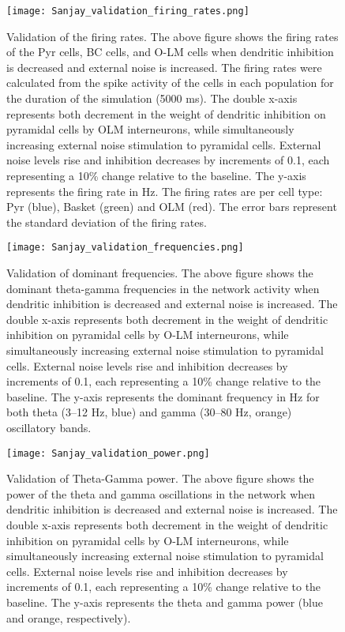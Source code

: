 \begin{figure}[htbp]
    \centering
    \texttt{[image: Sanjay\_validation\_firing\_rates.png]}
    \caption[Validation: Firing rates per population]{Validation of the firing rates.
        The above figure shows the firing rates of the Pyr cells, BC cells, and O-LM cells when dendritic inhibition is decreased and external noise is increased.
        The firing rates were calculated from the spike activity of the cells in each population for the duration of the simulation (5000 ms).
        The double x-axis represents both decrement in the weight of dendritic inhibition on pyramidal cells by OLM interneurons,
        while simultaneously increasing external noise stimulation to pyramidal cells.
        External noise levels rise and inhibition decreases by increments of 0.1, each representing a 10\% change relative to the baseline.
        The y-axis represents the firing rate in Hz.
        The firing rates are per cell type: Pyr (blue), Basket (green) and OLM (red).
        The error bars represent the standard deviation of the firing rates.}\label{fig:validation_firing_rates}
\end{figure}

\begin{figure}[htbp]
    \centering
    \texttt{[image: Sanjay\_validation\_frequencies.png]}
    \caption[Validation: Dominant frequencies]{Validation of dominant frequencies.
        The above figure shows the dominant theta-gamma frequencies in the network activity when dendritic inhibition is decreased and external noise is increased.
        The double x-axis represents both decrement in the weight of dendritic inhibition on pyramidal cells by O-LM interneurons,
        while simultaneously increasing external noise stimulation to pyramidal cells.
        External noise levels rise and inhibition decreases by increments of 0.1, each representing a 10\% change relative to the baseline.
        The y-axis represents the dominant frequency in Hz for both theta (3--12 Hz, blue) and gamma (30--80 Hz, orange) oscillatory bands.}\label{fig:validation_frequencies}
\end{figure}

\begin{figure}[htbp]
    \centering
    \texttt{[image: Sanjay\_validation\_power.png]}
    \caption[Validation: Theta-Gamma power]{Validation of Theta-Gamma power.
        The above figure shows the power of the theta and gamma oscillations in the network when dendritic inhibition is decreased and external noise is increased.
        The double x-axis represents both decrement in the weight of dendritic inhibition on pyramidal cells by O-LM interneurons,
        while simultaneously increasing external noise stimulation to pyramidal cells.
        External noise levels rise and inhibition decreases by increments of 0.1, each representing a 10\% change relative to the baseline.
        The y-axis represents the theta and gamma power (blue and orange, respectively).}\label{fig:validation_power}
\end{figure}

